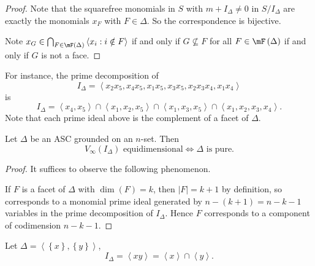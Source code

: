 \documentclass[co439]{subfiles}
\begin{document}
    \begin{proof}
        Note that the squarefree monomials in $S$ with $m+I_{\Delta}\neq 0$ in $S /I_{\Delta}$ are exactly the monomials $x_F$ with $F\in\Delta$. So the correspondence is bijective.

        Note $x_G\in\bigcap^{}_{F\in\mF\left( \Delta \right)}\left< x_i:i\notin F \right>$ if and only if $G\nsubseteq F$ for all $F\in\mF\left( \Delta \right)$ if and only if $G$ is not a face.
    \end{proof}

    \np For instance, the prime decomposition of 
    \begin{equation*}
        I_{\Delta} = \left< x_2x_5, x_4x_5, x_1x_5, x_3x_5, x_2x_3x_4, x_1x_4 \right>
    \end{equation*}
    is
    \begin{equation*}
        I_{\Delta} = \left< x_4,x_5 \right> \cap \left< x_1,x_2,x_5 \right> \cap \left< x_1,x_3,x_5 \right>\cap \left< x_1,x_2,x_3,x_4 \right>.    
    \end{equation*}
    Note that each prime ideal above is the complement of a facet of $\Delta$.

    \begin{lemma}{}
        Let $\Delta$ be an ASC grounded on an $n$-set. Then
        \begin{equation*}
            V_{\infty}\left( I_{\Delta} \right)\text{ equidimensional} \iff \text{$\Delta$ is pure}.
        \end{equation*}
    \end{lemma}
    
    \begin{proof}
        It suffices to observe the following phenomenon.

        If $F$ is a facet of $\Delta$ with $\dim\left( F \right) = k$, then $\left| F \right| = k+1$ by definition, so corresponds to a monomial prime ideal generated by $n-\left( k+1 \right) = n-k-1$ variables in the prime decomposition of $I_{\Delta}$. Hence $F$ corresponds to a component of codimension $n-k-1$. 
    \end{proof}
    
    \begin{example}{}
        Let $\Delta = \left< \left\lbrace x \right\rbrace, \left\lbrace y \right\rbrace \right>$,
        \begin{equation*}
            I_{\Delta} = \left< xy \right> = \left< x \right> \cap \left< y \right>.   
        \end{equation*}
    \end{example}
\end{document}
